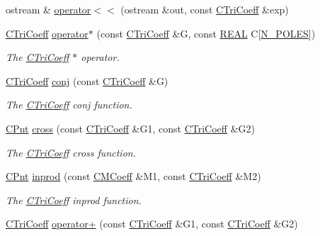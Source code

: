 \begin{DoxyCompactItemize}
\item 
ostream \& \hyperlink{classCTriCoeff_a47cfb1958c5a43e847aa4e45e1c2c5d4}{operator$<$$<$} (ostream \&out, const \hyperlink{classCTriCoeff}{C\-Tri\-Coeff} \&exp)
\item 
\hyperlink{classCTriCoeff}{C\-Tri\-Coeff} \hyperlink{classCTriCoeff_a8684b78e6ecaae7dfa436ee9f52365dd}{operator$\ast$} (const \hyperlink{classCTriCoeff}{C\-Tri\-Coeff} \&G, const \hyperlink{util_8h_a5821460e95a0800cf9f24c38915cbbde}{R\-E\-A\-L} C\mbox{[}\hyperlink{mcoeff_8h_ac23f9c13c5d07d9ce386f7a830c35e5a}{N\-\_\-\-P\-O\-L\-E\-S}\mbox{]})
\begin{DoxyCompactList}\small\item\em The \hyperlink{classCTriCoeff}{C\-Tri\-Coeff} $\ast$ operator. \end{DoxyCompactList}\item 
\hyperlink{classCTriCoeff}{C\-Tri\-Coeff} \hyperlink{classCTriCoeff_a66ea424a347d0a78069536bf701393a5}{conj} (const \hyperlink{classCTriCoeff}{C\-Tri\-Coeff} \&G)
\begin{DoxyCompactList}\small\item\em The \hyperlink{classCTriCoeff}{C\-Tri\-Coeff} conj function. \end{DoxyCompactList}\item 
\hyperlink{classCPnt}{C\-Pnt} \hyperlink{classCTriCoeff_ab5e8aeefc06a5962699ac639820d77be}{cross} (const \hyperlink{classCTriCoeff}{C\-Tri\-Coeff} \&G1, const \hyperlink{classCTriCoeff}{C\-Tri\-Coeff} \&G2)
\begin{DoxyCompactList}\small\item\em The \hyperlink{classCTriCoeff}{C\-Tri\-Coeff} cross function. \end{DoxyCompactList}\item 
\hyperlink{classCPnt}{C\-Pnt} \hyperlink{classCTriCoeff_a095588ecdb857546a57e3f8f33ec983d}{inprod} (const \hyperlink{classCMCoeff}{C\-M\-Coeff} \&M1, const \hyperlink{classCTriCoeff}{C\-Tri\-Coeff} \&M2)
\begin{DoxyCompactList}\small\item\em The \hyperlink{classCTriCoeff}{C\-Tri\-Coeff} inprod function. \end{DoxyCompactList}\item 
\hyperlink{classCTriCoeff}{C\-Tri\-Coeff} \hyperlink{classCTriCoeff_a6678a29fe9fa9c5d7616a7151866fd4c}{operator+} (const \hyperlink{classCTriCoeff}{C\-Tri\-Coeff} \&G1, const \hyperlink{classCTriCoeff}{C\-Tri\-Coeff} \&G2)

\end{DoxyCompactItemize}
